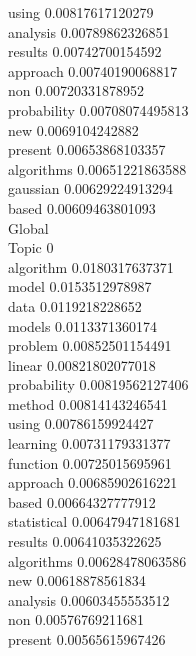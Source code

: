 \documentclass{article}
\begin{document}
using 0.00817617120279\\
analysis 0.00789862326851\\
results 0.00742700154592\\
approach 0.00740190068817\\
non 0.00720331878952\\
probability 0.00708074495813\\
new 0.0069104242882\\
present 0.00653868103357\\
algorithms 0.00651221863588\\
gaussian 0.00629224913294\\
based 0.00609463801093\\
Global\\
Topic 0\\
algorithm 0.0180317637371\\
model 0.0153512978987\\
data 0.0119218228652\\
models 0.0113371360174\\
problem 0.00852501154491\\
linear 0.00821802077018\\
probability 0.00819562127406\\
method 0.00814143246541\\
using 0.00786159924427\\
learning 0.00731179331377\\
function 0.00725015695961\\
approach 0.00685902616221\\
based 0.00664327777912\\
statistical 0.00647947181681\\
results 0.00641035322625\\
algorithms 0.00628478063586\\
new 0.00618878561834\\
analysis 0.00603455553512\\
non 0.00576769211681\\
present 0.00565615967426\\
\end{document}
